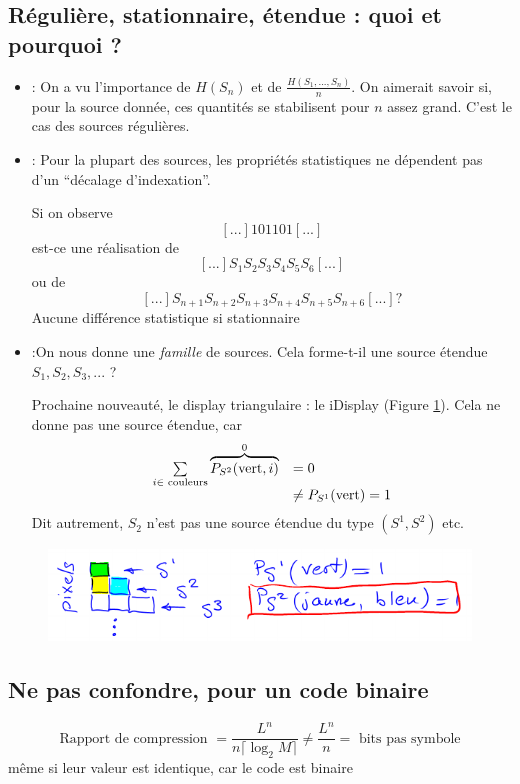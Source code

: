 \documentclass[11pt,a4paper]{article}
\begin{document}
\subsection[Récapitulation types sources]{Régulière, stationnaire, étendue : quoi et pourquoi ?}
\begin{itemize}
	\item {} : On a vu l'importance de $H(S_n)$ et de $\frac{H(S_1,...,S_n)}{n}$. On aimerait savoir si, pour la source donnée, ces quantités se stabilisent pour $n$ assez grand. C'est le cas des sources régulières.
	\item {} : Pour la plupart des sources, les propriétés statistiques ne dépendent pas d'un \enquote{décalage d'indexation}.
			\begin{exemple}
				Si on observe \[[...]101101[...]\] est-ce une réalisation de \[[...]S_1S_2S_3S_4S_5S_6[...]\] ou de \[[...]S_{n+1}S_{n+2}S_{n+3}S_{n+4}S_{n+5}S_{n+6}[...] ?\]
				Aucune différence statistique si stationnaire
			\end{exemple}
	\item 	{} :On nous donne une \textit{famille} de sources. Cela forme-t-il une source étendue $S_1,S_2,S_3,...$ ?
			\begin{exemple}
				Prochaine nouveauté, le display triangulaire : le iDisplay (Figure \ref{etendue}). Cela ne donne pas une source étendue, car \[\begin{array}{ll}
					\sum\limits_{i\in \text{ couleurs}}^{} \overbrace{P_{S^2}(\text{vert}, i)}^0 & = 0\\
						& \neq P_{S^1}(\text{vert}) = 1
				\end{array}
				\]
				Dit autrement, $S_2$ n'est pas une source étendue du type $(S^1,S^2)$ etc.
			\end{exemple}
\end{itemize} 			
\begin{figure}[!h]
	\centering
	\includegraphics[scale=0.5]{images/etendue}
	\caption{}
	\label{etendue}
\end{figure}

\subsection[Ne pas Confondre]{Ne pas confondre, pour un code binaire}
\[\text{Rapport de compression } = \frac{L^n}{n\lceil \log_2 M\rceil} \neq \frac{L^n}{n} = \text{ bits pas symbole}\]
même si leur valeur est identique, car le code est binaire
\newpage
\end{document}
